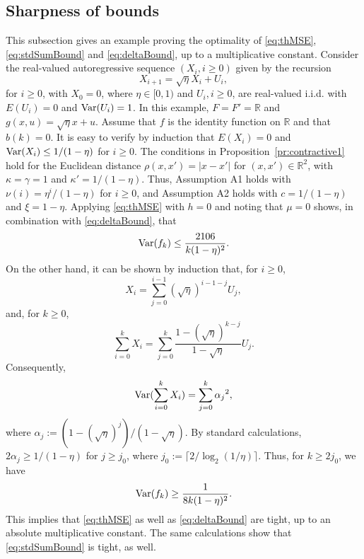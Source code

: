 \documentclass[a4paper,11pt]{article}
\begin{document}
\subsection{Sharpness of bounds}\label{sub:Sharp}
This subsection gives an example proving  the optimality of   \eqref{eq:thMSE},  \eqref{eq:stdSumBound}  and \eqref{eq:deltaBound}, up to a multiplicative constant.
Consider the real-valued autoregressive sequence   \((X_{i},i\geq0)\) given by the recursion \begin{equation*}
X_{i+1}=\sqrt{\eta}X_{i}+U_{i},
\end{equation*}    for \( i\geq 0\), with \(X_{0}=0\), where \(\eta\in[0,1)\) and    \(U_{i},i\geq0\),   are real-valued i.i.d. with \(E(U_{i})=0\) and \({\rm Var}(U_{i})=1\). In this example, \(F=F'=\mathbb{R}\) and \(g(x,u)=\sqrt{\eta}x+u\).
Assume that \(f\) is the identity function on \(\mathbb{R}\) and  that \(b(k)=0\). It is easy to verify by induction that \(E(X_{i})=0\) and \({\rm Var}(X_{i})\leq1/(1-\eta)\) for \(i\geq0\).  The conditions in Proposition~\ref{pr:contractive1} hold for the Euclidean distance \(\rho(x,x')=|x-x'|\) for \((x,x')\in\mathbb{R}^{2}\), with \(\kappa=\gamma=1\) and \(\kappa'=1/(1-\eta)\). Thus,  Assumption A1 holds with \(\nu(i)=\eta^{ i}/(1-\eta)\)  for \(i\geq0\), and Assumption A2 holds with  \(c=1/(1-\eta)\) and \(\xi=1-\eta\). Applying  \eqref{eq:thMSE} with \(h=0\)  and noting that \(\mu=0\) shows, in combination with \eqref{eq:deltaBound}, that\begin{displaymath}
 {\rm Var}(f_{k})\leq  \frac{2106}{k(1-\eta)^{2}}.
\end{displaymath}
On the other hand, it can be shown by induction that, for \(i\geq0\), \begin{displaymath}
X_{i}=\sum^{i-1}_{j=0}(\sqrt{\eta})^{i-1-j}U_{j},
\end{displaymath}
and, for \(k\geq0\),\begin{displaymath}
\sum_{i=0}^{k}X_{i}=\sum^{k}_{j=0}\frac{1-(\sqrt{\eta})^{k-j}}{1-\sqrt{\eta}}U_{j}.
\end{displaymath}  
Consequently, \begin{displaymath}
{\rm Var}(\sum_{i=0}^{k}X_{i})=\sum^{k}_{j=0}{\alpha _{j}}^{2},
\end{displaymath} where  \(\alpha _{j}:=(1-(\sqrt{\eta})^{j})/(1-\sqrt{\eta})\). By standard calculations,  \(2\alpha _{j}\ge1/(1-\eta)\) for \(j\geq j_{0}\), where \(j_{0}:=\lceil2/\log_{2}(1/\eta)\rceil\). Thus, for  \(k\geq2j_{0}\), we have \begin{displaymath}
{\rm Var}(f_{k})\geq\frac{1}{8k(1-\eta)^{2}}.
\end{displaymath}
This implies that  \eqref{eq:thMSE} as well as \eqref{eq:deltaBound} are tight, up to an absolute multiplicative constant. The same calculations show that \eqref{eq:stdSumBound} is tight, as well.
\end{document}
